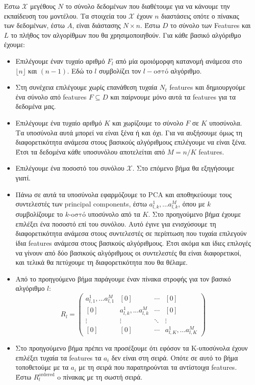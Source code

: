 \documentclass[a4paper,12pt]{report}
\theoremstyle{definitionNODot}
\begin{document}
	Έστω $\mathcal{X}$ μεγέθους $N$ το σύνολο δεδομένων που διαθέτουμε για να κάνουμε την εκπαίδευση του μοντέλου. Τα στοιχεία του $\mathcal{X}$ έχουν $n$ διαστάσεις οπότε ο πίνακας των δεδομένων, έστω $A$, είναι διάστασης $N\times n$. Έστω $D$ το σύνολο των Features και $L$ το πλήθος τον αλγορίθμων που θα χρησιμοποιηθούν. Για κάθε βασικό αλγόριθμο έχουμε:
	\begin{itemize}
		\item  Επιλέγουμε έναν τυχαίο αριθμό $F_l$ από μία ομοιόμορφη κατανομή ανάμεσα στο $\lfloor n \rfloor$ και $(n-1)$. Εδώ το $l$ συμβολίζει τον $l-\text{οστό}$ αλγόριθμο.
		\item Στη συνέχεια επιλέγουμε χωρίς επανάθεση τυχαία $N_t$ features και δημιουργούμε ένα σύνολο από features $F\subseteq D$ και παίρνουμε μόνο αυτά τα features για τα δεδομένα μας.
		\item Επιλέγουμε ένα τυχαίο αριθμό $K$ και χωρίζουμε το σύνολο $F$ σε $K$ υποσύνολα. Τα υποσύνολα αυτά μπορεί να είναι ξένα ή και όχι. Για να αυξήσουμε όμως τη διαφορετικότητα ανάμεσα στους βασικούς αλγόριθμους επιλέγουμε να είναι ξένα. Έτσι τα δεδομένα κάθε υποσυνόλου αποτελείται από $M=n/K$ features.
		\item Επιλέγουμε ένα ποσοστό του συνόλου $\mathcal{X}$. Στο επόμενο βήμα θα εξηγήσουμε γιατί.
		\item Πάνω σε αυτά τα υποσύνολα εφαρμόζουμε το PCA και αποθηκεύουμε τους συντελεστές των principal components, έστω $a_{l,k}^{1},...a_{l,k}^{M}$, όπου με $k$ συμβολίζουμε το $k\text{-οστό}$ υποσύνολο από τα $K$. Στο προηγούμενο βήμα έχουμε επιλέξει ένα ποσοστό επί του συνόλου. Αυτό έγινε για ενισχύσουμε τη διαφορετικότητα ανάμεσα στους συντελεστές σε περίπτωση που τυχαία επιλεγούν ίδια features ανάμεσα στους βασικούς αλγόριθμους. Έτσι ακόμα και ίδιες επιλογές να γίνουν από δύο βασικούς αλγόριθμους οι συντελεστές θα είναι διαφορετικοί, και τελικά θα πετύχουμε τη διαφορετικότητα που θα θέλαμε.
		\item Από το προηγούμενο βήμα παράγουμε έναν πίνακα στροφής για τον βασικό αλγόριθμο $l$: 
		\[
		R_l = 
		\begin{pmatrix}
			a_{l,1}^{1},...a_{l,1}^{M} & [0] & \cdots & [0] \\
			[0] & a_{l,k}^{1},...a_{l,k}^{M} & \cdots & [0] \\
			\vdots & \vdots & \ddots & \vdots \\
			[0] & [0] & \cdots & a_{l,K}^{1},...a_{l,K}^{M}
		\end{pmatrix}		
		\]
		\item Στο προηγούμενο βήμα πρέπει να προσέξουμε ότι εφόσον τα K-υποσύνολα έχουν επιλέξει τυχαία τα features τα $a_i$ δεν είναι στη σειρά. Οπότε σε αυτό το βήμα τοποθετούμε με τα $a_i$ με τη σειρά που παρατηρούνται τα αντίστοιχα features. Έστω $R^{\text{ordered}}_l$ o πίνακας με τη σωστή σειρά.

\end{itemize}
\end{document}
